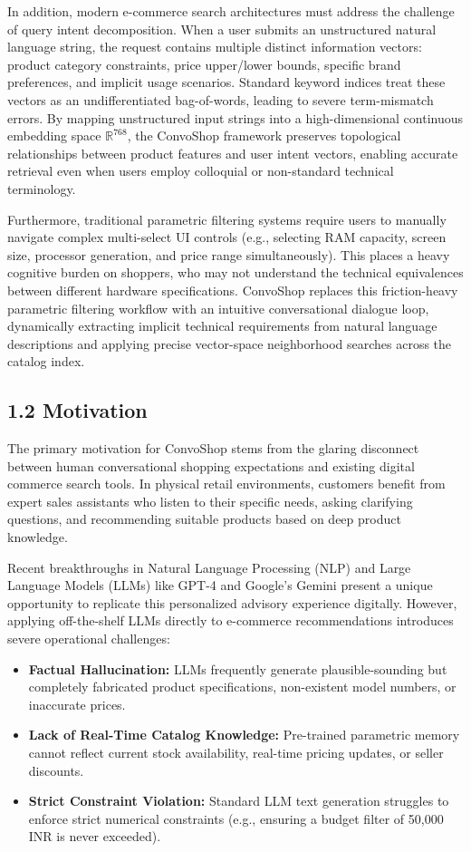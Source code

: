 \documentclass[12pt,a4paper]{article}
\begin{document}
In addition, modern e-commerce search architectures must address the challenge of query intent decomposition. When a user submits an unstructured natural language string, the request contains multiple distinct information vectors: product category constraints, price upper/lower bounds, specific brand preferences, and implicit usage scenarios. Standard keyword indices treat these vectors as an undifferentiated bag-of-words, leading to severe term-mismatch errors. By mapping unstructured input strings into a high-dimensional continuous embedding space $\mathbb{R}^{768}$, the ConvoShop framework preserves topological relationships between product features and user intent vectors, enabling accurate retrieval even when users employ colloquial or non-standard technical terminology.

Furthermore, traditional parametric filtering systems require users to manually navigate complex multi-select UI controls (e.g., selecting RAM capacity, screen size, processor generation, and price range simultaneously). This places a heavy cognitive burden on shoppers, who may not understand the technical equivalences between different hardware specifications. ConvoShop replaces this friction-heavy parametric filtering workflow with an intuitive conversational dialogue loop, dynamically extracting implicit technical requirements from natural language descriptions and applying precise vector-space neighborhood searches across the catalog index.

\subsection*{1.2 Motivation}
\label{sec:1.2}
The primary motivation for ConvoShop stems from the glaring disconnect between human conversational shopping expectations and existing digital commerce search tools. In physical retail environments, customers benefit from expert sales assistants who listen to their specific needs, asking clarifying questions, and recommending suitable products based on deep product knowledge. 

Recent breakthroughs in Natural Language Processing (NLP) and Large Language Models (LLMs) like GPT-4 and Google's Gemini present a unique opportunity to replicate this personalized advisory experience digitally. However, applying off-the-shelf LLMs directly to e-commerce recommendations introduces severe operational challenges:
\begin{itemize}
    \item \textbf{Factual Hallucination:} LLMs frequently generate plausible-sounding but completely fabricated product specifications, non-existent model numbers, or inaccurate prices.
    \item \textbf{Lack of Real-Time Catalog Knowledge:} Pre-trained parametric memory cannot reflect current stock availability, real-time pricing updates, or seller discounts.
    \item \textbf{Strict Constraint Violation:} Standard LLM text generation struggles to enforce strict numerical constraints (e.g., ensuring a budget filter of 50,000 INR is never exceeded).
\end{itemize}
\end{document}
